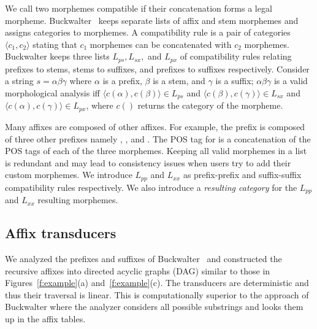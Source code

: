 \documentclass[11pt]{article}
\begin{document}
We call two morphemes compatible if their concatenation
forms a legal morpheme. 
Buckwalter~ keeps separate lists 
of affix and stem morphemes and assigns categories to
morphemes. 
A compatibility rule is a pair of categories 
$\langle c_1, c_2\rangle$  stating that $c_1$ morphemes
can be concatenated with $c_2$ morphemes.
Buckwalter keeps three lists $L_{ps}, L_{sx},$ and $L_{px}$ 
of compatibility rules relating
prefixes to stems, stems to suffixes, and prefixes to suffixes
respectively. 
Consider a string $s=\alpha\beta\gamma$ where $\alpha$ is 
a prefix, $\beta$ is a stem, and $\gamma$ is a suffix;
$\alpha\beta\gamma$ is a 
valid morphological analysis iff
$\langle c(\alpha),c(\beta)\rangle \in L_{ps}$ and
$\langle c(\beta),c(\gamma)\rangle \in L_{sx}$ and
$\langle c(\alpha),c(\gamma)\rangle \in L_{px}$, where
$c()$ returns the category of the morpheme.

Many affixes are composed of other affixes. For example,
the prefix  is composed of three other prefixes
namely , , and .
The POS tag for  is a concatenation
of the POS tags of each of the three morphemes. 
Keeping all valid morphemes in a list
is redundant and may lead to consistency issues when
users try to add their custom morphemes.
We introduce $L_{pp}$ and
$L_{xx}$ as prefix-prefix and suffix-suffix 
compatibility rules respectively.
We also introduce a {\em resulting category}
for the $L_{pp}$ and  $L_{xx}$ resulting morphemes.


\subsection{Affix transducers}
\label{sec:affixFSA}

We analyzed the prefixes and suffixes of 
Buckwalter~
and constructed the recursive affixes
into directed acyclic graphs (DAG) similar to 
those in Figures~\ref{f:example}(a) and~\ref{f:example}(c).
The transducers are deterministic and thus 
their traversal is linear.
This is computationally superior to the 
approach of Buckwalter where the analyzer considers
all possible substrings %
and looks them up in the affix tables. 
\end{document}
